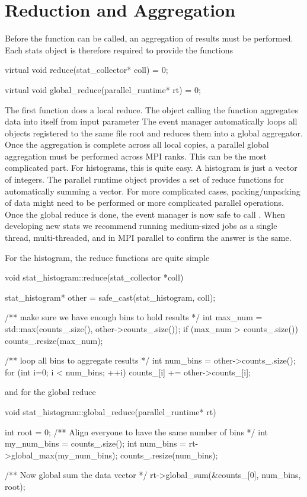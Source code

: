 \section{Reduction and Aggregation}\label{sec:reduceStats}
Before the  function can be called, an aggregation of results must be performed.
Each stats object is therefore required to provide the functions

\begin{CppCode} 
virtual void
reduce(stat_collector* coll) = 0;

virtual void
global_reduce(parallel_runtime* rt) = 0;
\end{CppCode}
The first function does a local reduce.
The object calling the  function aggregates data into itself from input parameter 
The event manager automatically loops all objects registered to the same file root and reduces them into a global aggregator.
Once the aggregation is complete across all local copies,
a parallel global aggregation must be performed across MPI ranks.
This can be the most complicated part.
For histograms, this is quite easy.
A histogram is just a vector of integers.
The \sstmacro parallel runtime object provides a set of reduce functions for automatically summing a vector.
For more complicated cases, packing/unpacking of data might need to be performed or more complicated parallel operations.
Once the global reduce is done, the event manager is now safe to call .
When developing new stats we recommend running medium-sized jobs as a single thread, multi-threaded, and in MPI parallel to confirm the answer is the same.

For the histogram, the reduce functions are quite simple

\begin{CppCode}
void
stat_histogram::reduce(stat_collector *coll)
{
  stat_histogram* other = safe_cast(stat_histogram, coll);

  /** make sure we have enough bins to hold results */
  int max_num = std::max(counts_.size(), other->counts_.size());
  if (max_num > counts_.size()){
    counts_.resize(max_num);
  }

  /** loop all bins to aggregate results */
  int num_bins = other->counts_.size();
  for (int i=0; i < num_bins; ++i){
    counts_[i] += other->counts_[i];
  }
}
\end{CppCode}

and for the global reduce
\begin{CppCode}
void
stat_histogram::global_reduce(parallel_runtime* rt)
{
  int root = 0;
  /** Align everyone to have the same number of bins */
  int my_num_bins = counts_.size();
  int num_bins = rt->global_max(my_num_bins);
  counts_.resize(num_bins);
  
  /** Now global sum the data vector */
  rt->global_sum(&counts_[0], num_bins, root);
}
\end{CppCode}


